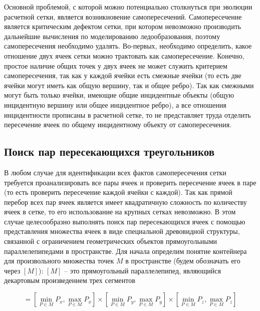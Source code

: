 Основной проблемой, с которой можно потенциально столкнуться при эволюции расчетной сетки, является возникновение самопересечений.
Самопересечение является критическим дефектом сетки, при котором невозможно производить дальнейшие вычисления по моделированию ледообразования, поэтому самопересечения необходимо удалять.
Во-первых, необходимо определить, какое отношение двух ячеек сетки можно трактовать как самопересечение.
Конечно, простое наличие общих точек у двух ячеек не может служить критерием самопересечения, так как у каждой ячейки есть смежные ячейки (то есть две ячейки могут иметь как общую вершину, так и общее ребро).
Так как смежными могут быть только ячейки, имеющие общие инцидентные объекты (общую инцидентную вершину или общее инцидентное ребро), а все отношения инцидентности прописаны в расчетной сетке, то не представляет труда отделить пересечение ячеек по общему инцидентному объекту от самопересечения.

\subsection{Поиск пар пересекающихся треугольников}

В любом случае для идентификации всех фактов самопересечения сетки требуется проанализировать все пары ячеек и проверить пересечение ячеек в паре (то есть проверить пересечение каждой ячейки с каждой).
Так как прямой перебор всех пар ячеек является имеет квадратичную сложность по количеству ячеек в сетке, то его использование на крупных сетках невозможно.
В этом случае целесообразно выполнять поиск пар пересекающихся ячеек с помощью представления множества ячеек в виде специальной древовидной структуры, связанной с ограничением геометрических объектов прямоугольными параллелепипедами в пространстве.
Для начала определим понятие контейнера для произвольного множества точек $M$ в пространстве (будем обозначать его через $[M]$): $[M]$ -- это прямоугольный параллелепипед, являющийся декартовым произведением трех сегментов

\begin{equation}
[M] = \left[\min_{P \in M}{P_x}, \max_{P \in M}{P_x}\right]
      \times \left[\min_{P \in M}{P_y}, \max_{P \in M}{P_y}\right]
      \times \left[\min_{P \in M}{P_z}, \max_{P \in M}{P_z}\right]
\end{equation}

